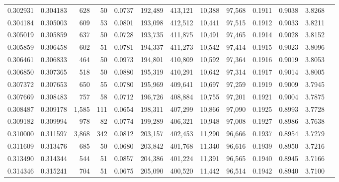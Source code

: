 \begin{tabular}{rrrrrrrrrrrrr}
0.302931 & 0.304183 &   628 &  50 &                                     0.0737 & 192,489 & 413,121 &  10,388 &  97,568 & 0.1911 & 0.9038 & 3.8268 \\
0.304184 & 0.305003 &   609 &  53 &                                     0.0801 & 193,098 & 412,512 &  10,441 &  97,515 & 0.1912 & 0.9033 & 3.8211 \\
0.305019 & 0.305859 &   637 &  50 &                                     0.0728 & 193,735 & 411,875 &  10,491 &  97,465 & 0.1914 & 0.9028 & 3.8152 \\
0.305859 & 0.306458 &   602 &  51 &                                     0.0781 & 194,337 & 411,273 &  10,542 &  97,414 & 0.1915 & 0.9023 & 3.8096 \\
0.306461 & 0.306833 &   464 &  50 &                                     0.0973 & 194,801 & 410,809 &  10,592 &  97,364 & 0.1916 & 0.9019 & 3.8053 \\
0.306850 & 0.307365 &   518 &  50 &                                     0.0880 & 195,319 & 410,291 &  10,642 &  97,314 & 0.1917 & 0.9014 & 3.8005 \\
0.307372 & 0.307653 &   650 &  55 &                                     0.0780 & 195,969 & 409,641 &  10,697 &  97,259 & 0.1919 & 0.9009 & 3.7945 \\
0.307669 & 0.308483 &   757 &  58 &                                     0.0712 & 196,726 & 408,884 &  10,755 &  97,201 & 0.1921 & 0.9004 & 3.7875 \\
0.308487 & 0.309178 & 1,585 & 111 &                                     0.0654 & 198,311 & 407,299 &  10,866 &  97,090 & 0.1925 & 0.8993 & 3.7728 \\
0.309182 & 0.309994 &   978 &  82 &                                     0.0774 & 199,289 & 406,321 &  10,948 &  97,008 & 0.1927 & 0.8986 & 3.7638 \\
0.310000 & 0.311597 & 3,868 & 342 &                                     0.0812 & 203,157 & 402,453 &  11,290 &  96,666 & 0.1937 & 0.8954 & 3.7279 \\
0.311609 & 0.313476 &   685 &  50 &                                     0.0680 & 203,842 & 401,768 &  11,340 &  96,616 & 0.1939 & 0.8950 & 3.7216 \\
0.313490 & 0.314344 &   544 &  51 &                                     0.0857 & 204,386 & 401,224 &  11,391 &  96,565 & 0.1940 & 0.8945 & 3.7166 \\
0.314346 & 0.315241 &   704 &  51 &                                     0.0675 & 205,090 & 400,520 &  11,442 &  96,514 & 0.1942 & 0.8940 & 3.7100 \\

\end{tabular}
